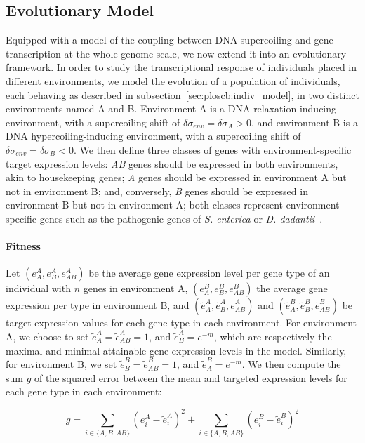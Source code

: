 \subsection{Evolutionary Model}
\label{sec:ploscb:evol_model}

Equipped with a model of the coupling between DNA supercoiling and gene transcription at the whole-genome scale, we now extend it into an evolutionary framework.
In order to study the transcriptional response of individuals placed in different environments, we model the evolution of a population of individuals, each behaving as described in subsection~\ref{sec:ploscb:indiv_model}, in two distinct environments named A and B.
Environment A is a DNA relaxation-inducing environment, with a supercoiling shift of $\delta\sigma_{env} = \delta\sigma_A > 0$, and environment B is a DNA hypercoiling-inducing environment, with a supercoiling shift of $\delta\sigma_{env} = \delta\sigma_B < 0$.
We then define three classes of genes with environment-specific target expression levels: \emph{AB} genes should be expressed in both environments, akin to housekeeping genes; \emph{A} genes should be expressed in environment A but not in environment B; and, conversely, \emph{B} genes should be expressed in environment B but not in environment A; both classes represent environment-specific genes such as the pathogenic genes of \emph{S. enterica} or \emph{D. dadantii}~\citep{cameron2012,herault2014}.

\paragraph{Fitness}
Let $(e^A_A, e^A_B, e^A_{AB})$ be the average gene expression level per gene type of an individual with $n$ genes in environment A, $(e^B_A, e^B_B, e^B_{AB})$ the average gene expression per type in environment B, and $(\tilde{e}^A_A, \tilde{e}^A_B, \tilde{e}^A_{AB})$ and $(\tilde{e}^B_A, \tilde{e}^B_B, \tilde{e}^B_{AB})$ be target expression values for each gene type in each environment.
For environment A, we choose to set $\tilde{e}^A_A = \tilde{e}^A_{AB} = 1$, and $\tilde{e}^A_B = e^{-m}$, which are respectively the maximal and minimal attainable gene expression levels in the model.
Similarly, for environment B, we set $\tilde{e}^B_B = \tilde{e}^B_{AB} = 1$, and $\tilde{e}^B_A = e^{-m}$.
We then compute the sum $g$ of the squared error between the mean and targeted expression levels for each gene type in each environment:

\begin{equation}
  g = \sum_{i\in\{A, B, AB\}}\left(e^A_i - \tilde{e}^A_i\right)^2 + \sum_{i\in\{A, B, AB\}}\left(e^B_i - \tilde{e}^B_i\right)^2
  \label{eq:gap}
\end{equation}

